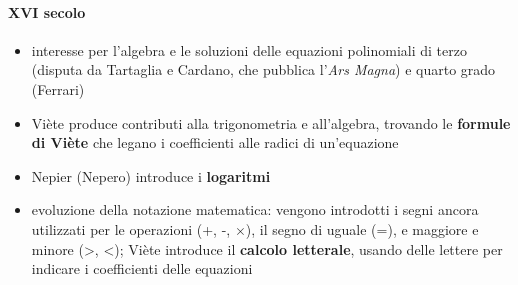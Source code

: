 \paragraph{XVI secolo}
\begin{itemize}
    \item interesse per l'algebra e le soluzioni delle equazioni polinomiali di terzo (disputa da Tartaglia e Cardano, che pubblica l'\textit{Ars Magna}) e quarto grado (Ferrari)
    \item Viète produce contributi alla trigonometria e all'algebra, trovando le \textbf{formule di Viète} che legano i coefficienti alle radici di un'equazione
    \item Nepier (Nepero) introduce i \textbf{logaritmi}
    \item evoluzione della notazione matematica: vengono introdotti i segni ancora utilizzati per le operazioni (+, -, $\times$), il segno di uguale (=), e maggiore e minore (>, <); Viète introduce il \textbf{calcolo letterale}, usando delle lettere per indicare i coefficienti delle equazioni
\end{itemize}
